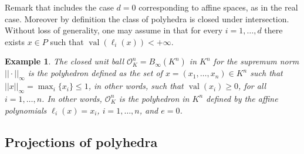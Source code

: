 \documentclass[a4paper,12pt]{article}
\newtheorem{example}{Example}
\newcommand{\aff}[1]{{\text{aff}(#1)}} %
\newcommand{\relint}[1]{{\text{relint}(#1)}} %
\newcommand{\simone}[1]{{\color{blue} #1}} %
\DeclareMathOperator{\val}{val}
\newcommand{\OK}{\mathcal{O}_K}
\begin{document}
Remark that  includes the case $d=0$ corresponding to affine spaces, as in the real case.
Moreover by definition the class of polyhedra is closed under intersection. Without loss of generality, one may
assume in  that for every $i=1,\ldots,d$ there exists $x \in P$ such that
$\val(\ell_i(x))<+\infty$.

\begin{example}
  The \emph{closed unit ball} $\OK^n=B_\infty(K^n)$ in $K^n$ for the supremum norm $||\cdot||_{\infty}$ is the
  polyhedron defined as the set of $x=(x_1,\ldots,x_n) \in K^n$ such that $||x||_{\infty} =
  \max_i\{x_i\} \leq 1$, in other words, such that $\val(x_i) \geq 0$, for all $i=1, \ldots, n$.
  In other words, $\OK^n$ is the polyhedron in $K^n$ defined by the affine polynomials
  $\ell_i(x)=x_i$, $i=1,\ldots, n$, and $e=0$. %
\end{example}


\subsection{Projections of polyhedra}
\end{document}
